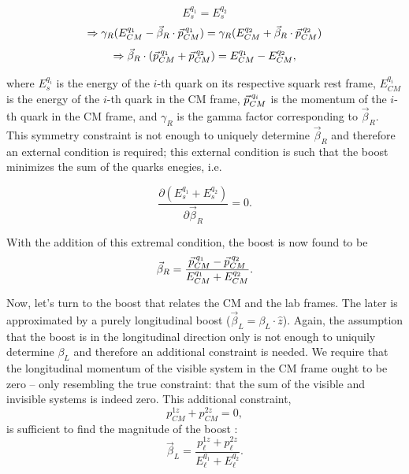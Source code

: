 \begin{equation}
\label{eq:razorCond1}
E^{q_{1}}_{s} = E^{q_{2}}_{s}
\end{equation}
\begin{equation}
\label{eq:razorCond11}
\Rightarrow\gamma_{R}(E^{q_{1}}_{CM} -\vec{\beta}_{R} \cdot \vec{p}_{CM}^{\hspace{0.06cm}q_{1}})= \gamma_{R}(E^{q_{2}}_{CM} +\vec{\beta}_{R} \cdot \vec{p}_{CM}^{\hspace{0.06cm}q_{2}})
\end{equation}
\begin{equation}
\label{eq:razorCond12}
\Rightarrow\vec{\beta}_{R} \cdot (\vec{p}_{CM}^{\hspace{0.06cm}q_{1}}+\vec{p}_{CM}^{\hspace{0.06cm}q_{2}})= E^{q_{1}}_{CM} -E^{q_{2}}_{CM},
\end{equation}

where $E^{q_{i}}_{s}$ is the energy of the $i$-th quark on its
respective squark rest frame, $E^{q_{i}}_{CM}$ is the energy of the
$i$-th quark in the CM frame, $\vec{p}_{CM}^{\hspace{0.06cm}q_{i}}$ is the momentum of the
$i$-th quark in the CM frame, and $\gamma_{R}$ is the gamma factor
corresponding to $\vec{\beta}_{R}$. This symmetry constraint is not
enough to uniquely determine $\vec{\beta}_{R}$ and therefore an
external condition is required; this external condition is such that
the boost minimizes the sum of the quarks enegies, i.e.

\begin{equation}
\label{razonMinCondition}
\frac{\partial (E^{q_{1}}_{s} + E^{q_{2}}_{s})}{\partial
  \vec{\beta}_{R}} = 0.
\end{equation}

With the addition of this extremal condition, the boost is now
found to be
\begin{equation}
\label{razonRboost}
  \vec{\beta}_{R}  = \frac{\vec{p}_{CM}^{\hspace{0.06cm}q_{1}}-\vec{p}_{CM}^{\hspace{0.06cm}q_{2}}}{E^{q_{1}}_{CM} + E^{q_{2}}_{CM}}.
\end{equation}


Now, let's turn to the boost that relates the CM and the lab
frames. The later is approximated by a
purely longitudinal boost ($\vec{\beta}_{L} = \beta_{L} \cdot \hat{z}$). Again, the assumption that the boost is in the longitudinal
direction only is not enough to uniquily determine $\beta_{L}$ and
therefore an additional constraint is needed. We require that the
longitudinal momentum of the visible system in the CM frame ought to
be zero -- only resembling the true constraint: that the sum of the visible
and invisible systems is indeed zero. This additional constraint, 
\begin{equation}
\label{eq:razorCond2}
p^{1z}_{CM} + p^{2z}_{CM} = 0,
\end{equation}
is sufficient to find the magnitude of the boost :
\begin{equation}
\label{razonLboost}
  \vec{\beta}_{L}  = \frac{p^{1z}_{\ell} + p^{2z}_{\ell}}{E^{q_{1}}_{\ell} + E^{q_{2}}_{\ell}}.
\end{equation}

